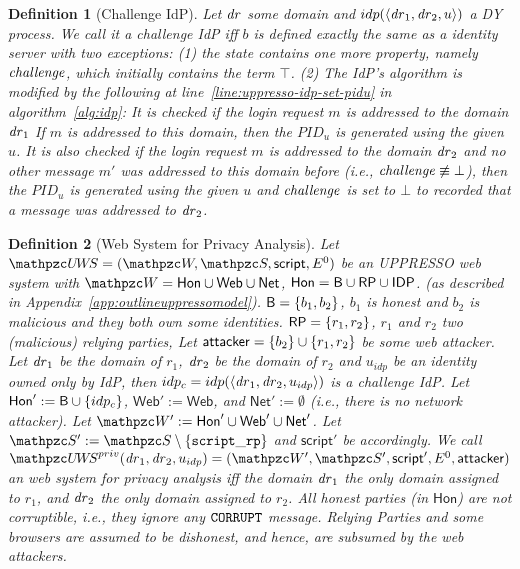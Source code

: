 \documentclass[letterpaper,onecolumn,10pt]{article}
\newtheorem{definition}{Definition}
\begin{document}
\begin{definition}[Challenge IdP]
  Let $\mathit{dr}$ some domain and 
  $idp(\langle {{}\mathit{dr}_1, \mathit{dr}_2, u} \rangle)$ a DY process. 
  We call it a \emph{challenge IdP} iff $b$
  is defined exactly the same as a identity server with two 
  exceptions: (1) the state contains one more property, 
  namely $\mathit{challenge}$, which initially contains the term 
  $\top$. 
  (2) The IdP's algorithm is modified by the following at 
  line~\ref{line:uppresso-idp-set-pidu} in 
  algorithm~\ref{alg:idp}: It is checked if the login 
  request $m$ is addressed to the domain $\mathit{dr}_1$ 
  If $m$ is addressed to this domain, then the $PID_u$ is 
  generated using the given $u$.
  It is also checked if the login request $m$ is addressed 
  to the domain $\mathit{dr}_2$ and no other message $m'$ was 
  addressed to this domain before (i.e., $\mathit{challenge} 
  \not\equiv \bot$), then the $PID_u$ is generated using 
  the given $u$ and $\mathit{challenge}$ is set to $\bot$ to 
  recorded that a message was addressed to $\mathit{dr}_2$.
\end{definition}

\begin{definition}[\uppresso Web System for Privacy Analysis]\label{def:uppresso-ws-priv}
  Let $\uppressowebsystem = (\bidsystem, \scriptset, 
  \mathsf{script}, E^0)$ be an UPPRESSO web system with 
  $\bidsystem = \mathsf{Hon} \cup \mathsf{Web} \cup 
  \mathsf{Net}$, 
  $\mathsf{Hon} = \mathsf{B} \cup \mathsf{RP} \cup \mathsf{IDP}$.
  (as described in Appendix~\ref{app:outlineuppressomodel}).
  $\mathsf{B} = \{b_1,b_2\}$, $b_1$ is honest and $b_2$ is 
  malicious and they both own some identities. 
  $\mathsf{RP} = \{r_1,r_2\}$, $r_1$ and $r_2$ two (malicious) 
  relying parties, 
  Let $\mathsf{attacker} = \{b_2\} \cup \{r_1,r_2\}$ be some 
  web attacker.
  Let $\mathit{dr}_1$ be the domain of $r_1$, $\mathit{dr}_2$ be the 
  domain of $r_2$ and $u_{idp}$ be an identity owned only by
  IdP, then $idp_c = idp(\langle {{}\mathit{dr}_1, \mathit{dr}_2, 
  u_{idp}} \rangle)$ is a challenge IdP. 
  Let $\mathsf{Hon}' := \mathsf{B} \cup \{idp_c\}$, 
  $\mathsf{Web}' := \mathsf{Web}$, 
  and $\mathsf{Net}' := \emptyset$ 
  (i.e., there is no network attacker).
  Let $\bidsystem' := \mathsf{Hon}' \cup \mathsf{Web}' \cup 
  \mathsf{Net}'$.  
  Let $\scriptset' := \scriptset \setminus 
  \{\str{script\_rp}\}$ and $\mathsf{script}'$ be accordingly.
  We call $\uppressoprivwebsystem(\mi{dr}_1, \mi{dr}_2, 
  u_{idp}) = (\bidsystem', \scriptset', \mathsf{script}', 
  E^0, \fAP{attacker})$ an \emph{\uppresso web system for 
  privacy analysis} 
  iff the domain $\mathit{dr}_1$ the only domain assigned to 
  $r_1$, and $\mathit{dr}_2$ the only domain assigned to $r_2$. 
  All honest parties (in $\mathsf{Hon}$) are not corruptible, 
  i.e., they ignore any $\mathtt{CORRUPT}$ message. Relying 
  Parties and some browsers are assumed to be dishonest, 
  and hence, are subsumed by the web attackers.
\end{definition}



\end{document}
